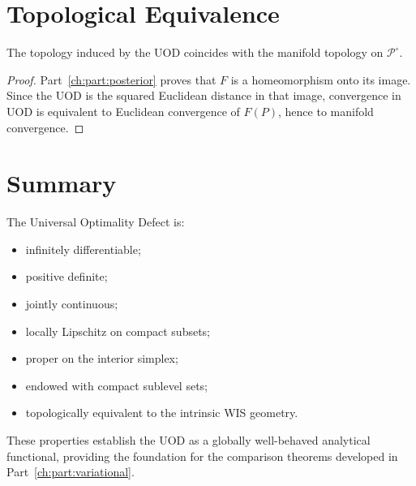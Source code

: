 \section{Topological Equivalence}\label{ch:sec:topological-equivalence}
\begin{theorem}
\label{ch:thm:23-8}
The topology induced by the UOD coincides with the manifold topology on
\(\mathcal P^\circ\).
\end{theorem}
\begin{proof} Part~\ref{ch:part:posterior} proves that \(F\) is a homeomorphism onto its image.
Since the UOD is the squared Euclidean distance in that image,
convergence in UOD is equivalent to Euclidean convergence of \(F(P)\),
hence to manifold convergence. 
\end{proof}
\section{Summary}\label{ch:sec:summary}
The Universal Optimality Defect is:
\begin{itemize}
\item infinitely differentiable;
\item positive definite;
\item jointly continuous;
\item locally Lipschitz on compact subsets;
\item proper on the interior simplex;
\item endowed with compact sublevel sets;
\item topologically equivalent to the intrinsic WIS geometry.
\end{itemize}
These properties establish the UOD as a globally well-behaved analytical
functional, providing the foundation for the comparison theorems
developed in Part~\ref{ch:part:variational}.
